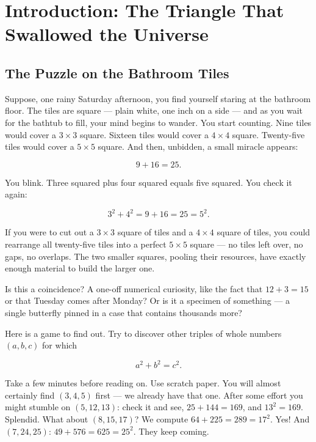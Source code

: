 \documentclass[11pt,openany]{book}
\theoremstyle{definition}
\theoremstyle{plain}
\theoremstyle{remark}
\begin{document}
\thispagestyle{empty}\mbox{}\clearpage

\tableofcontents
\clearpage

\mainmatter

\chapter*{Introduction: The Triangle That Swallowed the Universe}


\section*{The Puzzle on the Bathroom Tiles}


Suppose, one rainy Saturday afternoon, you find yourself staring at the bathroom floor. The tiles are square — plain white, one inch on a side — and as you wait for the bathtub to fill, your mind begins to wander. You start counting. Nine tiles would cover a $3 \times 3$ square. Sixteen tiles would cover a $4 \times 4$ square. Twenty-five tiles would cover a $5 \times 5$ square. And then, unbidden, a small miracle appears:

$$9 + 16 = 25.$$

You blink. Three squared plus four squared equals five squared. You check it again:

$$3^2 + 4^2 = 9 + 16 = 25 = 5^2.$$

If you were to cut out a $3 \times 3$ square of tiles and a $4 \times 4$ square of tiles, you could rearrange all twenty-five tiles into a perfect $5 \times 5$ square — no tiles left over, no gaps, no overlaps. The two smaller squares, pooling their resources, have exactly enough material to build the larger one.

Is this a coincidence? A one-off numerical curiosity, like the fact that $12 + 3 = 15$ or that Tuesday comes after Monday? Or is it a specimen of something — a single butterfly pinned in a case that contains thousands more?

Here is a game to find out. Try to discover other triples of whole numbers $(a, b, c)$ for which

$$a^2 + b^2 = c^2.$$

Take a few minutes before reading on. Use scratch paper. You will almost certainly find $(3, 4, 5)$ first — we already have that one. After some effort you might stumble on $(5, 12, 13)$: check it and see, $25 + 144 = 169$, and $13^2 = 169$. Splendid. What about $(8, 15, 17)$? We compute $64 + 225 = 289 = 17^2$. Yes! And $(7, 24, 25)$: $49 + 576 = 625 = 25^2$. They keep coming.
\end{document}
